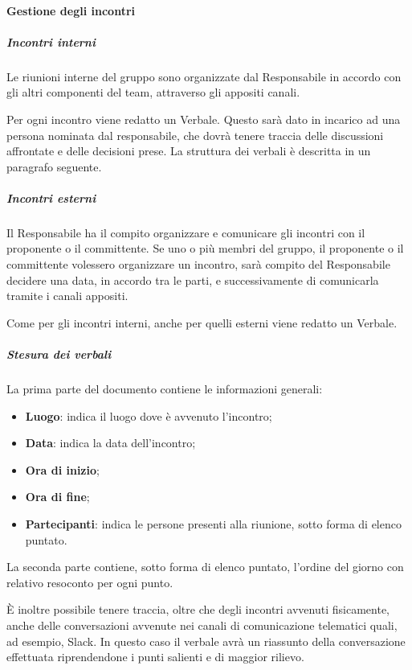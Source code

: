    		
   		
   	\paragraph{Gestione degli incontri}
   	
   		\subparagraph*{Incontri interni}
   		Le riunioni interne del gruppo sono organizzate dal Responsabile in accordo con gli altri componenti del team, attraverso gli appositi canali.
   		
   		\noindent Per ogni incontro viene redatto un Verbale. Questo sarà dato in incarico ad una persona nominata dal responsabile, che dovrà tenere traccia delle discussioni affrontate e delle decisioni prese. La struttura dei verbali è descritta in un paragrafo seguente.
   		
   		\subparagraph*{Incontri esterni}
   		Il Responsabile ha il compito organizzare e comunicare gli incontri con il proponente o il committente. Se uno o più membri del gruppo, il proponente o il committente volessero organizzare un incontro, sarà compito del Responsabile decidere una data, in accordo tra le parti, e successivamente di comunicarla tramite i canali appositi.
   		
   		\noindent Come per gli incontri interni, anche per quelli esterni viene redatto un Verbale.
   		\subparagraph*{Stesura dei verbali}
   		La prima parte del documento contiene le informazioni generali:
   		\begin{itemize}
   			\item \textbf{Luogo}: indica il luogo dove è avvenuto l'incontro;
   			\item \textbf{Data}: indica la data dell'incontro;
   			\item \textbf{Ora di inizio};
   			\item \textbf{Ora di fine};
   			\item \textbf{Partecipanti}: indica le persone presenti alla riunione, sotto forma di elenco puntato.
   		\end{itemize}
   		La seconda parte contiene, sotto forma di elenco puntato, l'ordine del giorno con relativo resoconto per ogni punto.
   		
   		\noindent È inoltre possibile tenere traccia, oltre che degli incontri avvenuti fisicamente, anche delle conversazioni avvenute nei canali di comunicazione telematici quali, ad esempio, Slack. In questo caso il verbale avrà un riassunto della conversazione effettuata riprendendone i punti salienti e di maggior rilievo.
   	
